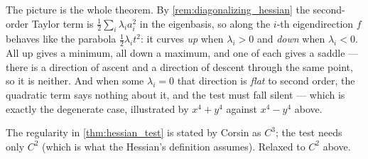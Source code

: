 \begin{center}
\end{center}

The picture is the whole theorem. By \cref{rem:diagonalizing_hessian} the second-order Taylor
term is $\tfrac12\sum_i\lambda_ia_i^2$ in the eigenbasis, so along the $i$-th eigendirection $f$
behaves like the parabola $\tfrac12\lambda_it^2$: it curves \emph{up} when $\lambda_i>0$ and
\emph{down} when $\lambda_i<0$. All up gives a minimum, all down a maximum, and one of each
gives a saddle --- there is a direction of ascent and a direction of descent through the same
point, so it is neither. And when some $\lambda_i = 0$ that direction is \emph{flat} to second
order, the quadratic term says nothing about it, and the test must fall silent --- which is
exactly the degenerate case, illustrated by $x^4+y^4$ against $x^4-y^4$ above.

\begin{ainote}
The regularity in \cref{thm:hessian_test} is stated by Corsin as $C^3$; the test needs only
$C^2$ (which is what the Hessian's definition assumes). Relaxed to $C^2$ above.
\end{ainote}

